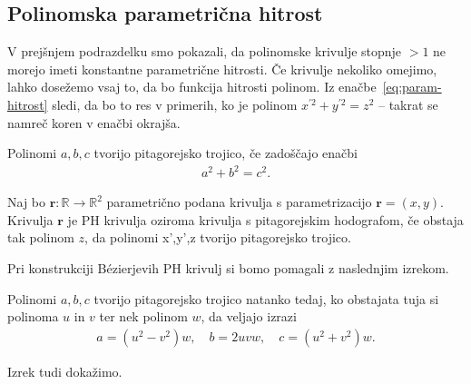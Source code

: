 \documentclass[isrm2, tisk]{fmfdelo}
\newcommand{\R}{\mathbb R}
\begin{document}
    \subsection{Polinomska parametrična hitrost}
    V prejšnjem podrazdelku smo pokazali, da polinomske krivulje stopnje $>1$ ne morejo imeti konstantne parametrične hitrosti.
    Če krivulje nekoliko omejimo, lahko dosežemo vsaj to, da bo funkcija hitrosti polinom.
    Iz enačbe~\eqref{eq:param-hitrost} sledi, da bo to res v primerih, ko je polinom $x^{'2}+y^{'2}=z^2$ – takrat se namreč koren v enačbi okrajša.
    \begin{definicija}
        \label{def:pitagorejska}
        Polinomi $a,b,c$ tvorijo pitagorejsko trojico, če zadoščajo enačbi
        \begin{align*}
            a^2+b^2=c^2.
        \end{align*}
    \end{definicija}
    \begin{definicija}
        Naj bo $\mathbf{r}:\R\to\R^2$ parametrično podana krivulja s parametrizacijo $\mathbf{r}=(x,y)$.
        Krivulja $\mathbf{r}$ je PH krivulja oziroma krivulja s pitagorejskim hodografom, če obstaja tak polinom $z$, da polinomi x',y',z tvorijo pitagorejsko trojico.
    \end{definicija}
    \noindent Pri konstrukciji Bézierjevih PH krivulj si bomo pomagali z naslednjim izrekom.
    \begin{izrek}
        \label{izrek:pitagorejske}         %
        Polinomi $a,b,c$ tvorijo pitagorejsko trojico natanko tedaj, ko obstajata tuja si polinoma $u$ in $v$ ter nek polinom  $w$, da veljajo izrazi
        \begin{align*}
            a=(u^2-v^2)w,\quad b=2uvw,\quad c=(u^2+v^2)w.
        \end{align*}
    \end{izrek}
    \noindent Izrek tudi dokažimo.
\end{document}
